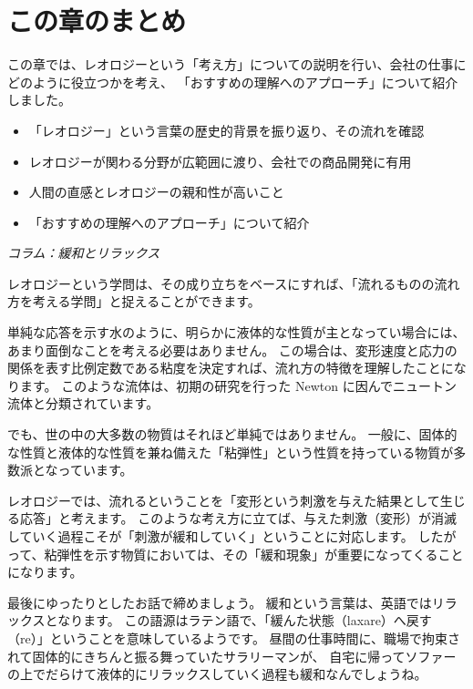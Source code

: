 \documentclass[uplatex,dvipdfmx,a4paper,11pt]{jsarticle}
\begin{document}
\section{この章のまとめ}
この章では、レオロジーという「考え方」についての説明を行い、会社の仕事にどのように役立つかを考え、
「おすすめの理解へのアプローチ」について紹介しました。
\begin{boxnote}
	\large
	\begin{itemize}
		\item 「レオロジー」という言葉の歴史的背景を振り返り、その流れを確認
		\item レオロジーが関わる分野が広範囲に渡り、会社での商品開発に有用
		\item 人間の直感とレオロジーの親和性が高いこと
		\item 「おすすめの理解へのアプローチ」について紹介
	\end{itemize}
\end{boxnote}

\newpage

\begin{longartdeco}
	\begin{center}
	\emph{コラム：緩和とリラックス}	
	\end{center}

	レオロジーという学問は、その成り立ちをベースにすれば、「流れるものの流れ方を考える学問」と捉えることができます。
	
	単純な応答を示す水のように、明らかに液体的な性質が主となってい場合には、あまり面倒なことを考える必要はありません。
	この場合は、変形速度と応力の関係を表す比例定数である粘度を決定すれば、流れ方の特徴を理解したことになります。
	このような流体は、初期の研究を行った Newton に因んでニュートン流体と分類されています。
	
	でも、世の中の大多数の物質はそれほど単純ではありません。
	一般に、固体的な性質と液体的な性質を兼ね備えた「粘弾性」という性質を持っている物質が多数派となっています。
	
	レオロジーでは、流れるということを「変形という刺激を与えた結果として生じる応答」と考えます。
	このような考え方に立てば、与えた刺激（変形）が消滅していく過程こそが「刺激が緩和していく」ということに対応します。
	したがって、粘弾性を示す物質においては、その「緩和現象」が重要になってくることになります。
	
	最後にゆったりとしたお話で締めましょう。
	緩和という言葉は、英語ではリラックスとなります。
	この語源はラテン語で、「緩んた状態（laxare）へ戻す（re）」ということを意味しているようです。
	昼間の仕事時間に、職場で拘束されて固体的にきちんと振る舞っていたサラリーマンが、
	自宅に帰ってソファーの上でだらけて液体的にリラックスしていく過程も緩和なんでしょうね。

\end{longartdeco}
\end{document}
